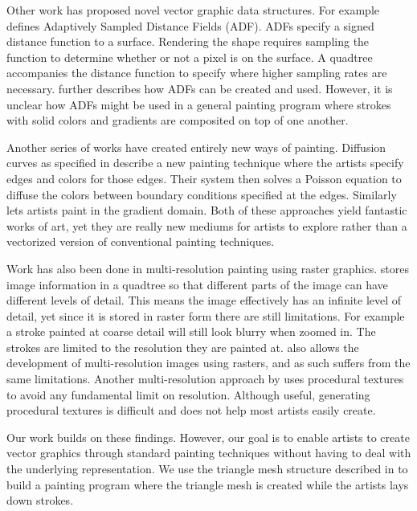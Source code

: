 \documentclass[review]{acmsiggraph}
\begin{document}
Other work has proposed novel vector graphic data structures. For example \cite{Frisken:2000:ASD:344779.344899}
defines Adaptively Sampled Distance Fields (ADF). ADFs specify a signed distance function to a surface.
Rendering the shape requires sampling the function to determine whether or not a pixel is on the surface.
A quadtree accompanies the distance function to specify where higher sampling rates are necessary. \cite{Bremer:2001:VCM}
further describes how ADFs can be created and used. However, it is unclear how ADFs might be used in a general
painting program where strokes with solid colors and gradients are composited on top of one another.

Another series of works have created entirely new ways of painting. Diffusion curves as specified in \cite{Orzan:2008:DCV:1360612.1360691}
describe a new painting technique where the artists specify edges and colors for those edges. Their system
then solves a Poisson equation to diffuse the colors between boundary conditions specified at the edges.
Similarly \cite{McCann:2008:RGP:1360612.1360692}
lets artists paint in the gradient domain. Both of these approaches yield fantastic works of art, yet
they are really new mediums for artists to explore rather than a vectorized version of conventional
painting techniques.

Work has also been done in multi-resolution painting using raster graphics. \cite{Berman:1994:MPC:192161.192181}
stores image information in a quadtree so that different parts of the image can have different levels of detail.
This means the image effectively has an infinite level of detail, yet since it is stored in raster form
there are still limitations. For example a stroke painted at coarse detail will still look blurry when
zoomed in. The strokes are limited to the resolution they are painted at. \cite{Carr:2004:PD:1186562.1015809}
also allows the development of multi-resolution images using rasters, and as such suffers from the
same limitations. Another multi-resolution approach by \cite{Perlin:1995:LPP:218380.218437} uses
procedural textures to avoid any fundamental limit on resolution. Although useful,
generating procedural textures is difficult and does not help most artists easily create.

Our work builds on these findings. However, our goal is to enable artists to create vector
graphics through standard painting techniques without having to deal with the underlying representation.
We use the triangle mesh structure described in \cite{10.1109/TVCG.2012.76} to build a painting program
where the triangle mesh is created while the artists lays down strokes. 
\end{document}
